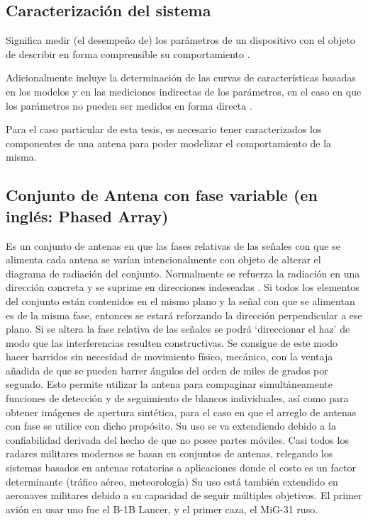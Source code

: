 \subsection{Caracterización del sistema}

Significa medir (el desempeño de) los parámetros de un dispositivo con el objeto de describir en
forma comprensible su comportamiento \cite{Mittermayer2007}.

Adicionalmente incluye la determinación de las curvas de características basadas
en los modelos y en las mediciones indirectas de los parámetros, en el caso en que los parámetros no pueden ser medidos
en forma directa \cite{Mittermayer2007}.

Para el caso particular de esta tesis, es necesario tener caracterizados los componentes de una antena para poder modelizar el 
comportamiento de la misma.


\subsection{Conjunto de Antena con fase variable (en inglés: Phased Array)}

Es un conjunto de antenas en que las fases relativas de las señales con que se alimenta cada antena se varían intencionalmente
con objeto de alterar el diagrama de radiación del conjunto. Normalmente se refuerza la radiación en una dirección concreta y
se suprime en direcciones indeseadas \cite{Standard1996}. Si todos los elementos del conjunto están contenidos en el mismo plano
y la señal con que se alimentan es de la misma fase, entonces se estará reforzando la dirección perpendicular a ese plano. Si
se altera la fase relativa de las señales se podrá \enquote*{direccionar el haz} de modo que las interferencias resulten
constructivas. Se consigue de este modo hacer barridos sin necesidad de movimiento físico, mecánico, con la ventaja añadida de
que se pueden barrer ángulos del orden de miles de grados por segundo. Esto permite utilizar la antena para compaginar
simultáneamente funciones de detección y de seguimiento de blancos individuales, así como para obtener imágenes de apertura
sintética, para el caso en que el arreglo de antenas con fase se utilice con dicho propósito. Su uso se va extendiendo debido a
la confiabilidad derivada del hecho de que no posee partes móviles. Casi todos los radares militares modernos se basan en
conjuntos de antenas, relegando los sistemas basados en antenas rotatorias a aplicaciones donde el costo es un factor
determinante (tráfico aéreo, meteorología) Su uso está también extendido en aeronaves militares debido a su capacidad de
seguir múltiples objetivos. El primer avión en usar uno fue el B-1B Lancer, y el primer caza, el MiG-31 ruso.

